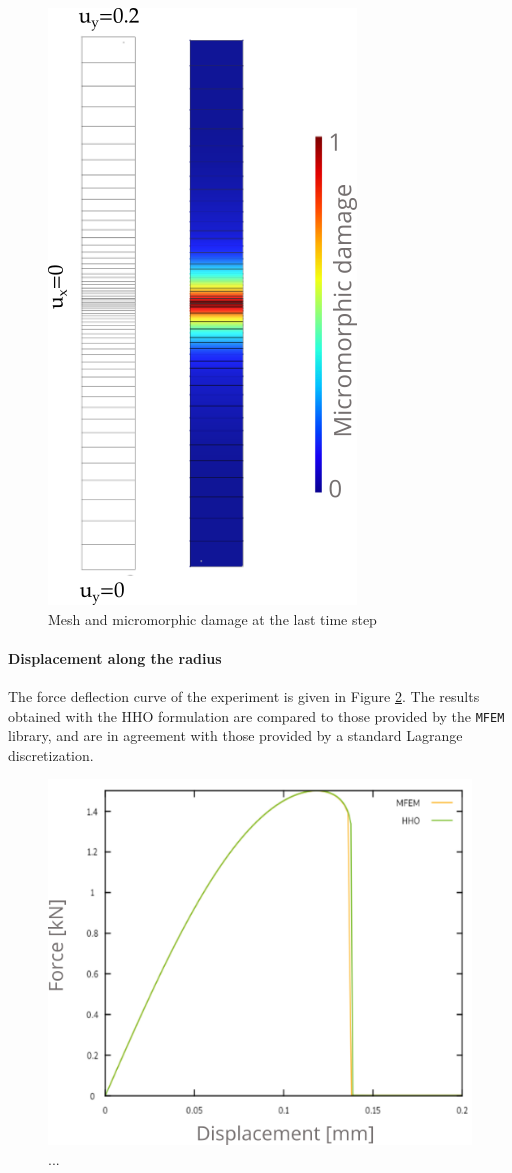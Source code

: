 \begin{figure}[H]
    \centering
    \includegraphics[width=5.cm]{../chapter_03_hho_micromorphic/figures/rod.png}
    \caption{Mesh and micromorphic damage at the last time step}
    \label{fig_rod_micromirphic}
\end{figure}

\paragraph{Displacement along the radius}

The force deflection curve of the experiment is given in Figure \ref{fig_rod_micromirphic_cruve}. The results obtained with the HHO formulation are compared to those provided by
the \texttt{MFEM} library, and are in agreement with those provided by a standard Lagrange discretization.
%
% 
% 
\begin{figure}[H]
    \centering
    \includegraphics[width=7.cm]{../chapter_03_hho_micromorphic/figures/rod_curve.png}
    \caption{...}
    \label{fig_rod_micromirphic_cruve}
\end{figure}


